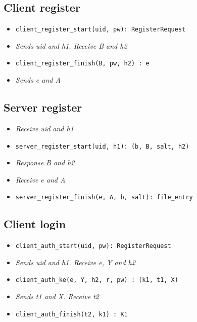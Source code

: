 \documentclass[../report.tex]{subfiles}
\begin{document}
\subsection{Client register}
\begin{itemize}
 \item \verb|client_register_start(uid, pw): RegisterRequest|
 \item \emph{Sends uid and h1. Receive B and h2}
 \item \verb|client_register_finish(B, pw, h2) : e|
 \item \emph{Sends e and A}
\end{itemize}


\subsection{Server register}
\begin{itemize}
 \item \emph{Receive uid and h1}
 \item \verb|server_register_start(uid, h1): (b, B, salt, h2)|
 \item \emph{Response B and h2}
 \item \emph{Receive e and A}
 \item \verb|server_register_finish(e, A, b, salt): file_entry|
\end{itemize}



\subsection{Client login}
\begin{itemize}
 \item \verb|client_auth_start(uid, pw): RegisterRequest| %
 \item \emph{Sends uid and h1. Receive e, Y and h2}
 \item \verb|client_auth_ke(e, Y, h2, r, pw) : (k1, t1, X)|
 \item \emph{Sends t1 and X. Receive t2}
 \item \verb|client_auth_finish(t2, k1) : K1|

\end{itemize}
\end{document}
